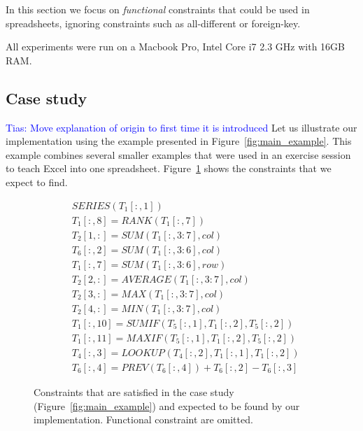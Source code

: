 \documentclass{sig-alternate-05-2015}
\newcommand{\tias}[1]{\textcolor{blue}{{\sc Tias:} #1}\xspace}
\newcommand{\range}[3]{\ensuremath{#1[#2,#3]}}
\newcommand{\rangeto}[2]{#1{:}#2}
\newcommand{\rangeall}{:}
\newcommand{\eccalc}[2]{\ensuremath{#1 = #2}}
\newcommand{\ecrank}[2]{\eccalc{#1}{\mathit{RANK}(#2)}}
\newcommand{\eclookupf}[4]{\ensuremath{\mathit{LOOKUP}_{\mathit{#4}}(#1, #2, #3)}}
\newcommand{\eclookup}[4]{\eccalc{#1}{\eclookupf{#2}{#3}{#4}{}}}
\newcommand{\ecaggc}[3]{\eccalc{#2}{\mathit{#1}(#3, col)}}
\newcommand{\ecsumc}[2]{\eccalc{#1}{\mathit{SUM}(#2, col)}}
\newcommand{\ecsumr}[2]{\eccalc{#1}{\mathit{SUM}(#2, row)}}
\newcommand{\ecaggif}[5]{\eccalc{#2}{\mathit{#1IF}(#3, #4, #5)}}
\begin{document}
In this section we focus on \textit{functional} constraints that could be used in spreadsheets, ignoring constraints such as all-different or foreign-key.

All experiments were run on a Macbook Pro, Intel Core i7 2.3 GHz with 16GB RAM.

\subsection{Case study}
\tias{Move explanation of origin to first time it is introduced}
Let us illustrate our implementation using the example presented in Figure~\ref{fig:main_example}.
This example combines several smaller examples that were used in an exercise session to teach Excel into one spreadsheet.
Figure~\ref{fig:sol_example} shows the constraints that we expect to find.

\begin{figure}
  {\small
    \begin{align*}
      & SERIES(\range{T_{1}}{\rangeall}{1}) \\
%
      & \ecrank{\range{T_{1}}{\rangeall}{8}}{\range{T_{1}}{\rangeall}{7}} \\
%
      & \ecsumc{\range{T_{2}}{1}{\rangeall}}{\range{T_{1}}{\rangeall}{\rangeto{3}{7}}} \\
%
      & \ecsumc{\range{T_{6}}{\rangeall}{2}}{\range{T_{1}}{\rangeall}{\rangeto{3}{6}}} \\
%
      & \ecsumr{\range{T_{1}}{\rangeall}{7}}{\range{T_{1}}{\rangeall}{\rangeto{3}{6}}} \\
%
      & \ecaggc{AVERAGE}{\range{T_{2}}{2}{\rangeall}}{\range{T_{1}}{\rangeall}{\rangeto{3}{7}}} \\
%
      & \ecaggc{MAX}{\range{T_{2}}{3}{\rangeall}}{\range{T_{1}}{\rangeall}{\rangeto{3}{7}}} \\
%
      & \ecaggc{MIN}{\range{T_{2}}{4}{\rangeall}}{\range{T_{1}}{\rangeall}{\rangeto{3}{7}}} \\
%
      & \ecaggif{SUM}{\range{T_{1}}{\rangeall}{10}}{\range{T_{5}}{\rangeall}{1}}{\range{T_{1}}{\rangeall}{2}}{\range{T_{5}}{\rangeall}{2}} \\
%
      & \ecaggif{MAX}{\range{T_{1}}{\rangeall}{11}}{\range{T_{5}}{\rangeall}{1}}{\range{T_{1}}{\rangeall}{2}}{\range{T_{5}}{\rangeall}{2}} \\
%
      & \eclookup{\range{T_{4}}{\rangeall}{3}}{\range{T_{4}}{\rangeall}{2}}{\range{T_{1}}{\rangeall}{1}}{\range{T_{1}}{\rangeall}{2}} \\
%
      & \range{T_{6}}{\rangeall}{4} = PREV(\range{T_{6}}{\rangeall}{4}) + \range{T_{6}}{\rangeall}{2} - \range{T_{6}}{\rangeall}{3}
    \end{align*}
  }
  \caption{Constraints that are satisfied in the case study (Figure~\ref{fig:main_example}) and expected to be found by our implementation. Functional constraint are omitted.}
  \label{fig:sol_example}
\end{figure}
\end{document}
